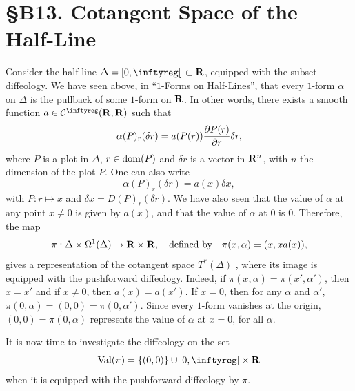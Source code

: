 
\chapter*{\S B13. Cotangent Space of the Half-Line}
\setcounter{footnote}{0}


\begin{abstract}
  We investigate the nature and structure of the cotangent space of the embedded half-line
  $\Delta = \LeftClosedInterval{0,\infty}\,\subset \RR$.
\end{abstract}


Consider the half-line $\Delta = \LeftClosedInterval{0,\infty}\,\subset \RR$,
equipped with the subset diffeology.
We have seen above, in ``$1$-Forms on Half-Lines'',
that every $1$-form $\alpha$ on $\Delta$ is the pullback of some $1$-form on $\mathbf{R}$.
In other words, there exists a smooth function $a \in \Cinfty(\RR,\RR)$ such that
$$
  \alpha(P)_r(\delta r) = a(P(r)){\partial P(r) \over \partial r}\delta r,
  $$
where $P$ is a plot in $\Delta$, $r\in \mathrm{dom}(P)$ and $\delta r$ is a vector in $\mathbf{R}^n$,
with $n$ the dimension of the plot $P$.
One can also write
$$
  \alpha(P)_r(\delta r) = a(x)\delta x,
  $$
with $P : r \mapsto x$ and $\delta x = D(P)_r(\delta r)$.
We have also seen that the value of $\alpha$ at any point $x\neq 0$ is given by $a(x)$,
and that the value of $\alpha$ at $0$ is $0$.
Therefore, the map
$$
  \pi : \Delta \times \Omega^1(\Delta) \to \mathbf{R} \times \mathbf{R},
  \quad \mbox{defined by} \quad
  \pi(x,\alpha) = (x, x a(x)),
  $$
gives a representation of the cotangent space $T^*(\Delta)$ \cite[6.48]{PIZ13},
where its image is equipped with the pushforward diffeology.
Indeed,
if $\pi(x,\alpha) = \pi(x',\alpha')$,
then $x=x'$ and if $x\neq 0$, then $a(x)=a(x')$.
If $x=0$,
then for any $\alpha$ and $\alpha'$,
$\pi(0,\alpha)= (0,0) = \pi(0,\alpha')$.
Since every $1$-form vanishes at the origin,
$(0,0)=\pi(0,\alpha)$ represents the value of $\alpha$ at $x=0$,
for all $\alpha$.

It is now time to investigate the diffeology on the set
$$
  \Val(\pi) = \{(0,0)\} \cup \OpenInterval{0,\infty} \times \RR
  $$
when it is equipped with the pushforward diffeology by $\pi$.

